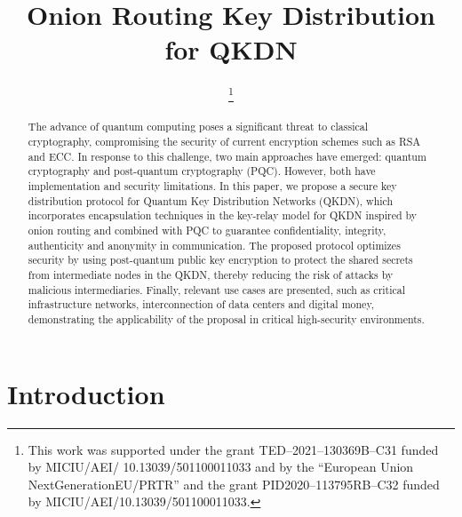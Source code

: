 \documentclass[conference]{IEEEtran}
\begin{document}
\title{Onion Routing Key Distribution for QKDN}

\author{
\thanks{This work was supported under the grant TED–2021–130369B–C31 funded by MICIU/AEI/
10.13039/501100011033 and by the “European Union NextGenerationEU/PRTR” and the grant  PID2020–113795RB–C32 funded by MICIU/AEI/10.13039/501100011033.}
}


\maketitle

\begin{abstract}
The advance of quantum computing poses a significant threat to classical cryptography, compromising the security of current encryption schemes such as RSA and ECC. In response to this challenge, two main approaches have emerged: quantum cryptography and post-quantum cryptography (PQC). However, both have implementation and security limitations. In this paper, we propose a secure key distribution protocol for Quantum Key Distribution Networks (QKDN), which incorporates encapsulation techniques in the key-relay model for QKDN inspired by onion routing and combined with PQC to guarantee confidentiality, integrity, authenticity and anonymity in communication. The proposed protocol optimizes security by using post-quantum public key encryption to protect the shared secrets from intermediate nodes in the QKDN, thereby reducing the risk of attacks by malicious intermediaries. Finally, relevant use cases are presented, such as critical infrastructure networks, interconnection of data centers and digital money, demonstrating the applicability of the proposal in critical high-security environments.
\end{abstract}

\section{Introduction \label{sec:intro}}
\end{document}
